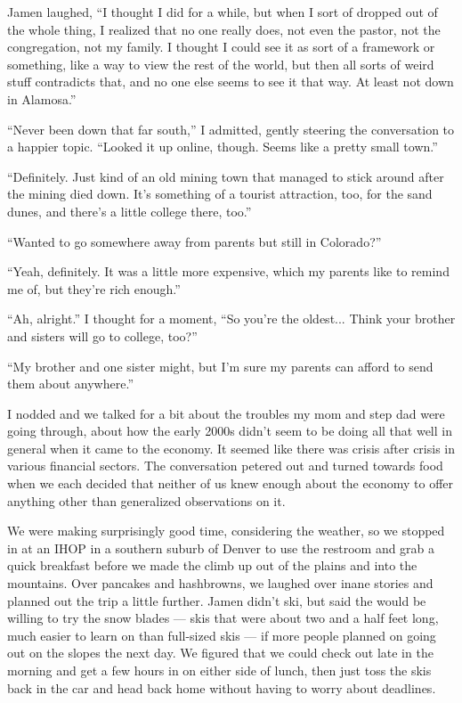 Jamen laughed, ``I thought I did for a while, but when I sort of dropped out of the whole thing, I realized that no one really does, not even the pastor, not the congregation, not my family.  I thought I could see it as sort of a framework or something, like a way to view the rest of the world, but then all sorts of weird stuff contradicts that, and no one else seems to see it that way.  At least not down in Alamosa.''

``Never been down that far south,'' I admitted, gently steering the conversation to a happier topic.  ``Looked it up online, though.  Seems like a pretty small town.''

``Definitely.  Just kind of an old mining town that managed to stick around after the mining died down.  It's something of a tourist attraction, too, for the sand dunes, and there's a little college there, too.''

``Wanted to go somewhere away from parents but still in Colorado?''

``Yeah, definitely.  It was a little more expensive, which my parents like to remind me of, but they're rich enough.''

``Ah, alright.''  I thought for a moment, ``So you're the oldest...  Think your brother and sisters will go to college, too?''

``My brother and one sister might, but I'm sure my parents can afford to send them about anywhere.''

I nodded and we talked for a bit about the troubles my mom and step dad were going through, about how the early 2000s didn't seem to be doing all that well in general when it came to the economy.  It seemed like there was crisis after crisis in various financial sectors.  The conversation petered out and turned towards food when we each decided that neither of us knew enough about the economy to offer anything other than generalized observations on it.

We were making surprisingly good time, considering the weather, so we stopped in at an IHOP in a southern suburb of Denver to use the restroom and grab a quick breakfast before we made the climb up out of the plains and into the mountains.  Over pancakes and hashbrowns, we laughed over inane stories and planned out the trip a little further.  Jamen didn't ski, but said the would be willing to try the snow blades --- skis that were about two and a half feet long, much easier to learn on than full-sized skis --- if more people planned on going out on the slopes the next day.  We figured that we could check out late in the morning and get a few hours in on either side of lunch, then just toss the skis back in the car and head back home without having to worry about deadlines.

